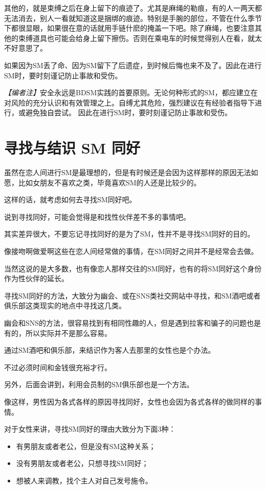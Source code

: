 \documentclass[12pt,UTF8]{ctexbook}
\begin{document}
其他的，就是束缚之后在身上留下的痕迹了。尤其是麻绳的勒痕，有的人一两天都无法消去，别人一看就知道这是捆绑的痕迹。特别是手腕的部位，不管在什么季节下都很显眼，如果很在意的话就用手链什麽的掩盖一下吧。除了麻绳，也要注意其他的束缚道具也可能会给身上留下擦伤。否则在乘电车的时候觉得别人在看，就太不好意思了。

如果因为SM丢了命、因为SM留下了后遗症，到时候后悔也来不及了。因此在进行SM时，要时刻谨记防止事故和受伤。

\textit{【编者注】}安全永远是BDSM实践的首要原则。无论何种形式的SM，都应建立在对风险的充分认识和有效管理之上。自缚尤其危险，强烈建议在有经验者指导下进行，或避免独自尝试。
因此在进行SM时，要时刻谨记防止事故和受伤。

\section{寻找与结识 SM 同好}

虽然在恋人间进行SM是最理想的，但是有时候还是会因为这样那样的原因无法如愿，比如女朋友不喜欢之类，毕竟喜欢SM的人还是比较少的。

这样的话，就考虑如何去寻找SM同好吧。

说到寻找同好，可能会觉得是和找性伙伴差不多的事情吧。

其实差异很大，不要忘记寻找同好的是为了SM，性并不是寻找SM同好的目的。

像接吻啊做爱啊这些在恋人间经常做的事情，在SM同好之间并不是经常会去做。

当然这说的是大多数，也有像恋人那样交往的SM同好，也有的将SM同好这个身份作为性伙伴的延长。

寻找SM同好的方法，大致分为幽会、或在SNS类社交网站中寻找，和SM酒吧或者俱乐部这类现实的地点中寻找这几类。

幽会和SNS的方法，很容易找到有相同性趣的人，但是遇到拉客和骗子的问题也是有的，所以实际并不是那么容易。

通过SM酒吧和俱乐部，来结识作为客人去那里的女性也是个办法。

不过必须时间和金钱很充裕才行。

另外，后面会讲到，利用会员制的SM俱乐部也是一个方法。

像这样，男性因为各式各样的原因寻找同好，女性也会因为各式各样的做同样的事情。

对于女性来讲，寻找SM同好的理由大致分为下面3种：

\begin{itemize}
\item 有男朋友或者老公，但是没有SM这种关系；
\item 没有男朋友或者老公，只想寻找SM同好；
\item 想被人来调教，找个主人对自己发号施令。
\end{itemize}
\end{document}
